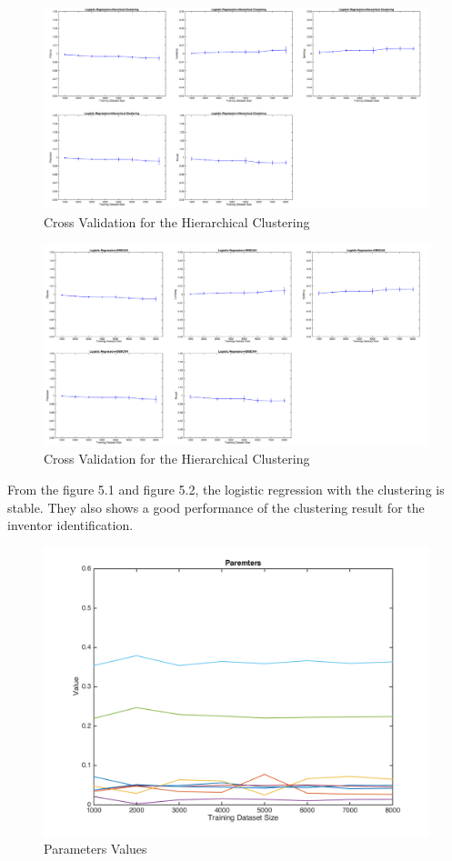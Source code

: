 \begin{figure}
\centering
\includegraphics[scale=0.23]{CVHi.pdf}
\caption{Cross Validation for the Hierarchical Clustering}
\end{figure}
\begin{figure} 
\centering
\includegraphics[scale=0.23]{CVDB.pdf}
\caption{Cross Validation for the Hierarchical Clustering}
\end{figure}
From the figure 5.1 and figure 5.2, the logistic regression with the clustering is stable. They also shows a good performance of the clustering result for the inventor identification. 

\begin{figure}
\centering
\includegraphics[scale=0.5]{parameters.png}
\caption{Parameters Values}
\end{figure}
 
